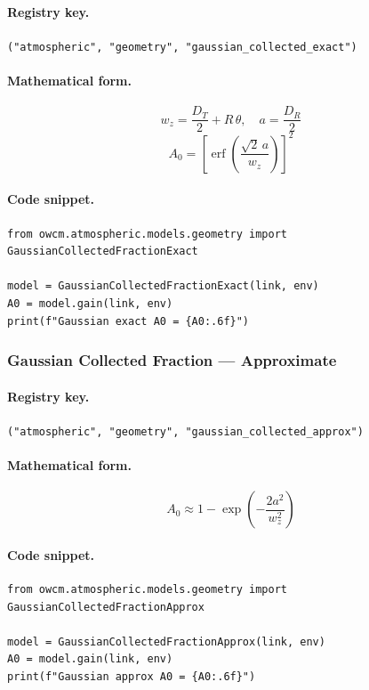 \documentclass[11pt,a4paper]{article}
\begin{document}
\paragraph{Registry key.} \texttt{("atmospheric", "geometry", "gaussian\_collected\_exact")}

\paragraph{Mathematical form.}
\begin{equation}
w_z = \frac{D_T}{2} + R\,\theta, \quad a = \frac{D_R}{2}
\end{equation}
\begin{equation}
\boxed{A_0 = \left[\operatorname{erf}\!\left(\frac{\sqrt{2}\,a}{w_z}\right)\right]^2}
\end{equation}

\paragraph{Code snippet.}
\begin{lstlisting}
from owcm.atmospheric.models.geometry import GaussianCollectedFractionExact

model = GaussianCollectedFractionExact(link, env)
A0 = model.gain(link, env)
print(f"Gaussian exact A0 = {A0:.6f}")
\end{lstlisting}

\subsubsection{Gaussian Collected Fraction --- Approximate}
\label{sec:gauss_approx}

\paragraph{Registry key.} \texttt{("atmospheric", "geometry", "gaussian\_collected\_approx")}

\paragraph{Mathematical form.}
\begin{equation}
\boxed{A_0 \approx 1 - \exp\!\left(-\frac{2a^2}{w_z^2}\right)}
\end{equation}

\paragraph{Code snippet.}
\begin{lstlisting}
from owcm.atmospheric.models.geometry import GaussianCollectedFractionApprox

model = GaussianCollectedFractionApprox(link, env)
A0 = model.gain(link, env)
print(f"Gaussian approx A0 = {A0:.6f}")
\end{lstlisting}
\end{document}

